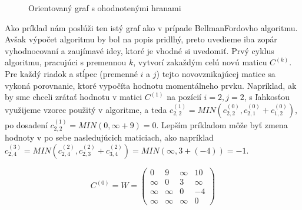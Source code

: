 \begin{figure}[H]
  \caption{Orientovaný graf s ohodnotenými hranami}
  \label{floyd-washall_priklad}
\end{figure}

Ako príklad nám poslúži ten istý graf ako v prípade Bellman\textendash Fordovho algoritmu. Avšak výpočet algoritmu by bol na popis pridlhý, preto uvedieme iba zopár vyhodnocovaní a zaujímavé idey, ktoré je vhodné si uvedomiť. Prvý cyklus algoritmu, pracujúci s premennou $k$, vytvorí zakaždým celú novú maticu $C^{(k)}$. Pre každý riadok a stĺpec (premenné $i$ a $j$)  tejto novovznikajúcej matice sa vykoná porovnanie, ktoré vypočíta hodnotu momentálneho prvku. Napríklad, ak by sme chceli zrátať hodnotu v matici $C^{(1)}$ na pozícií $i = 2, j = 2$, s ľahkosťou využijeme vzorec použitý v algoritme, a teda $c^{(1)}_{2,2} = MIN (c^{(0)}_{2,2}, c^{(0)}_{2,1} + c^{(0)}_{1,2})$, po dosadení $c^{(1)}_{2,2} = MIN (0, \infty + 9) = 0$. Lepším príkladom môže byť zmena hodnoty v po sebe nasledujúcich maticiach, ako napríklad $c^{(3)}_{2,4} = MIN (c^{(2)}_{2,4}, c^{(2)}_{2,3} + c^{(2)}_{3,4}) = MIN (\infty, 3 + (-4)) = -1$.\newline

\begin{equation}
  \label{C0}
  C^{(0)} = W =
  \begin{pmatrix}
    0 & 9 & \infty & 10 \\
    \infty & 0 & 3 & \infty \\
    \infty & \infty & 0 & -4 \\
    \infty & \infty & \infty & 0
  \end{pmatrix}
\end{equation}

